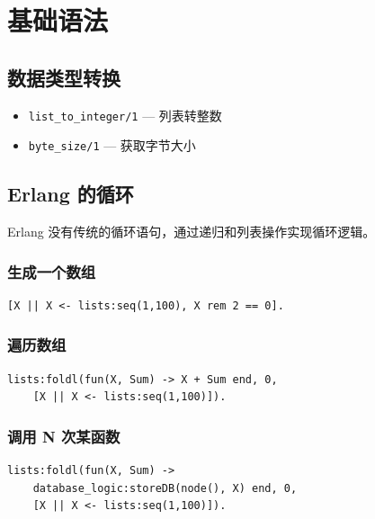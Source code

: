 \section{基础语法}

\subsection{数据类型转换}

\begin{itemize}[leftmargin=1.5em]
    \item \lstinline|list_to_integer/1| --- 列表转整数
    \item \lstinline|byte_size/1| --- 获取字节大小
\end{itemize}

\subsection{Erlang 的循环}

Erlang 没有传统的循环语句，通过递归和列表操作实现循环逻辑。

\subsubsection{生成一个数组}

\begin{lstlisting}
[X || X <- lists:seq(1,100), X rem 2 == 0].
\end{lstlisting}

\subsubsection{遍历数组}

\begin{lstlisting}
lists:foldl(fun(X, Sum) -> X + Sum end, 0,
    [X || X <- lists:seq(1,100)]).
\end{lstlisting}

\subsubsection{调用 N 次某函数}

\begin{lstlisting}
lists:foldl(fun(X, Sum) ->
    database_logic:storeDB(node(), X) end, 0,
    [X || X <- lists:seq(1,100)]).
\end{lstlisting}

